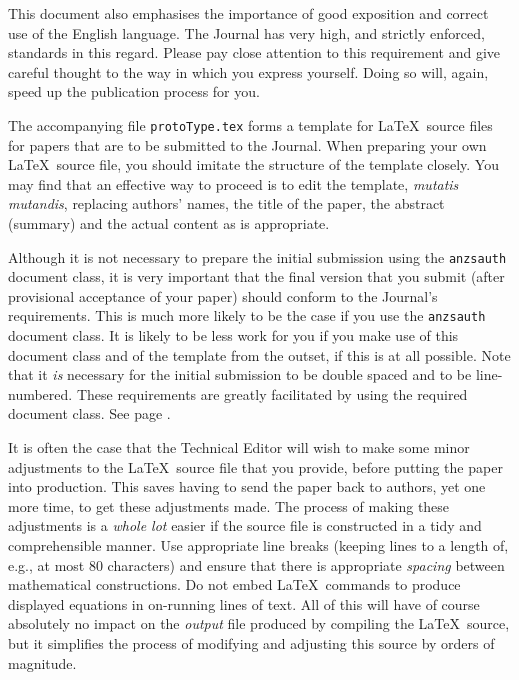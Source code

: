 \documentclass[times, doublespace]{anzsauth}
\begin{document}
This document also emphasises the importance of good exposition and
correct use of the English language.  The Journal has very high,
and strictly enforced, standards in this regard.  Please pay close
attention to this requirement and give careful thought to the way
in which you express yourself.  Doing so will, again, speed up the
publication process for you.

The accompanying file \texttt{protoType.tex} forms a template for
\LaTeX\ source files for papers that are to be submitted to the
Journal.  When preparing your own \LaTeX\ source file, you should
imitate the structure of the template closely.  You may find that
an effective way to proceed is to edit the template, \textit{mutatis
mutandis}, replacing authors' names, the title of the paper,
the abstract (summary) and the actual content as is appropriate.

Although it is not necessary to prepare the initial submission using
the \texttt{anzsauth} document class, it is very important that
the final version that you submit (after provisional acceptance of
your paper) should conform to the Journal's requirements.  This is
much more likely to be the case if you use the \texttt{anzsauth}
document class.  It is likely to be less work for you if you make
use of this document class and of the template from the outset,
if this is at all possible. Note that it \emph{is} necessary for
the initial submission to be double spaced and to be line-numbered.
These requirements are greatly facilitated by using the required
document class.  See page \pageref{pg:dsln}.

It is often the case that the Technical Editor will wish to make
some minor adjustments to the \LaTeX\ source file that you provide,
before putting the paper into production.  This saves having to
send the paper back to authors, yet one more time, to get these
adjustments made.  The process of making these adjustments is
a \emph{whole lot} easier if the source file is constructed in
a tidy and comprehensible manner.  Use appropriate line breaks
(keeping lines to a length of, e.g., at most 80 characters) and
ensure that there is appropriate \emph{spacing} between mathematical
constructions.  Do not embed \LaTeX\ commands to produce displayed
equations in on-running lines of text.  All of this will have of
course absolutely no impact on the \emph{output} file produced
by compiling the \LaTeX\ source, but it simplifies the process of
modifying and adjusting this source by orders of magnitude.

\newpage


\end{document}
